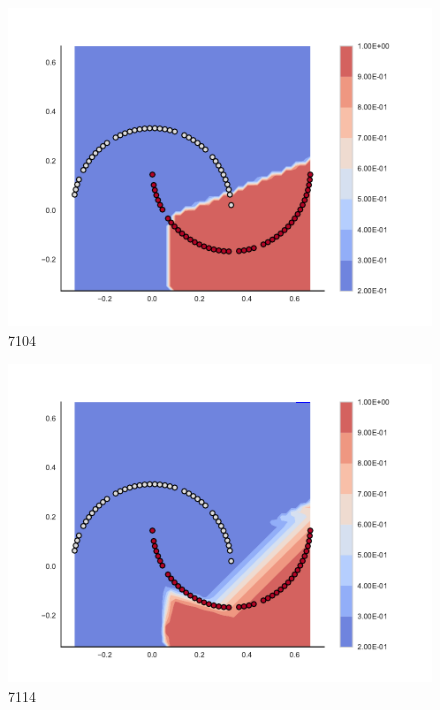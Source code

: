 \begin{subfigure}[b]{0.09\textwidth}
    \includegraphics[clip, trim=2.35cm 1.75cm 4.5cm 0cm,width=\textwidth]{img/convergence/7104.pdf}
    \caption{7104}
    \label{fig:convergence_7104}
\end{subfigure}
%
\begin{subfigure}[b]{0.09\textwidth}
    \includegraphics[clip, trim=2.35cm 1.75cm 4.5cm 0cm,width=\textwidth]{img/convergence/7114.pdf}
    \caption{7114}
    \label{fig:convergence_7114}
\end{subfigure}
%

